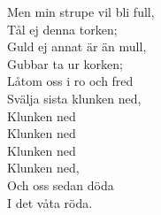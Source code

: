 Men min strupe vil bli full,\\
Tål ej denna torken;\\
Guld ej annat är än mull,\\
Gubbar ta ur korken;\\
Låtom oss i ro och fred\\
Svälja sista klunken ned,\\
	Klunken ned\\
	Klunken ned\\
	Klunken ned\\
	Klunken ned,\\
Och oss sedan döda\\
I det våta röda.
